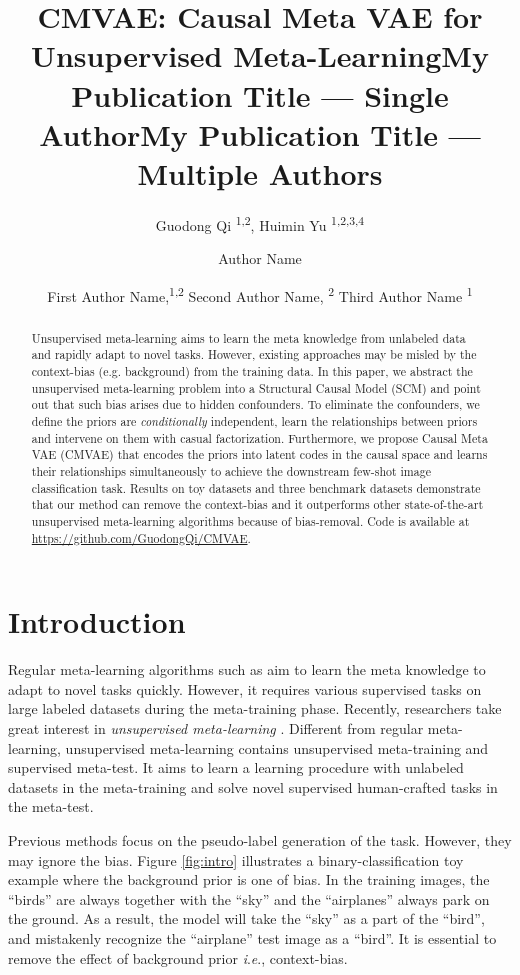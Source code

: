 \documentclass[letterpaper]{article} \usepackage{aaai23}  \usepackage{times}  \usepackage{helvet}  \usepackage{courier}  \usepackage[hyphens]{url}  \usepackage{graphicx} \urlstyle{rm} \def\UrlFont{\rm}  \usepackage{natbib}  \usepackage{caption} \frenchspacing  \setlength{\pdfpagewidth}{8.5in}  \setlength{\pdfpageheight}{11in}  \usepackage{algorithm}
\title{CMVAE: Causal Meta VAE for Unsupervised Meta-Learning}
\author{
Guodong Qi \textsuperscript{\rm 1,2},
Huimin Yu \textsuperscript{\rm 1,2,3,4}\\
}
\title{My Publication Title --- Single Author}
\author {
Author Name
}
\title{My Publication Title --- Multiple Authors}
\author {
First Author Name,\textsuperscript{\rm 1,\rm 2}
Second Author Name, \textsuperscript{\rm 2}
Third Author Name \textsuperscript{\rm 1}
}
\newcommand{\ie}{\textit{i}.\textit{e}.}
\theoremstyle{plain}
\theoremstyle{definition}
\theoremstyle{remark}
\begin{document}
\maketitle

\begin{abstract}
	Unsupervised meta-learning aims to learn the meta knowledge from unlabeled data and rapidly adapt to novel tasks. However, existing approaches may be misled by the  context-bias (e.g. background) from the training data. In this paper, we abstract the unsupervised meta-learning problem into a Structural Causal Model (SCM) and point out that such bias arises due to hidden confounders. To eliminate the confounders, we define the priors are \textit{conditionally} independent, learn the relationships between priors and intervene on them with casual factorization. Furthermore, we propose Causal Meta VAE (CMVAE) that encodes the priors into latent codes in the causal space and learns their relationships simultaneously to achieve the downstream few-shot image classification task. Results on toy datasets and three benchmark datasets demonstrate that our method can remove the context-bias and it outperforms other state-of-the-art unsupervised meta-learning algorithms because of bias-removal. Code is available at \url{https://github.com/GuodongQi/CMVAE}.
\end{abstract}

\section{Introduction}

\label{sec:introduction}Regular meta-learning algorithms such as \cite{finn2017model, snellPrototypicalNetworksFewshot2017} aim to learn the meta knowledge to adapt to novel tasks quickly. However, it requires various supervised tasks on large labeled datasets during the meta-training phase. Recently, researchers take great interest in \textit{unsupervised meta-learning} \cite{hsu2018unsupervised, khodadadeh2021unsupervised}. Different from  regular meta-learning, unsupervised meta-learning contains unsupervised meta-training and supervised meta-test. It aims to learn a learning procedure with unlabeled datasets in the meta-training and solve novel supervised human-crafted tasks in the meta-test.

Previous methods focus on the pseudo-label generation of the task. However, they may ignore the bias. Figure \ref {fig:intro} illustrates a binary-classification toy example where the background prior is one of bias. In the training images, the ``birds'' are always together with the ``sky'' and the ``airplanes'' always park on the ground. As a result, the model will take the ``sky'' as a part of the ``bird'', and mistakenly recognize the ``airplane'' test image as a ``bird''. It is essential to remove the  effect of background prior \ie, context-bias.
\end{document}
